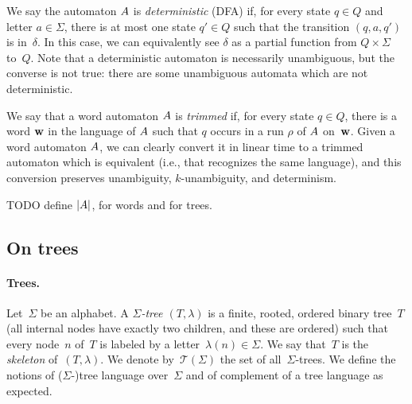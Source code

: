 We say the automaton $A$ is \emph{deterministic} (DFA) if, for every state $q\in Q$ and letter $a \in \Sigma$, there is at most one state $q' \in Q$ such that the transition $(q, a, q')$ is in~$\delta$. In this case, we can equivalently see $\delta$ as a partial function from $Q \times \Sigma$ to~$Q$.
Note that a deterministic automaton is necessarily unambiguous, but the converse is not true: there are some unambiguous automata which are not deterministic.

We say that a word automaton $A$ is \emph{trimmed} if, for every state $q\in Q$, there is a word $\mathbf{w}$ in the language of $A$ such that $q$ occurs in a run $\rho$ of $A$ on~$\mathbf{w}$. Given a word automaton $A$, we can clearly convert it in linear time to a trimmed automaton which is equivalent (i.e., that recognizes the same language), and this conversion preserves unambiguity, $k$-unambiguity, and determinism.

TODO define $|A|$, for words and for trees.

\subsection{On trees}
\label{subsubsec:ufas-trees}

\paragraph*{Trees.}
Let~$\Sigma$ be an alphabet.  A \emph{$\Sigma$-tree $(T,\lambda)$} is a finite,
rooted, ordered binary tree~$T$ (all internal nodes have exactly two children,
and these are ordered) such that every node~$n$ of~$T$ is labeled by a
letter~$\lambda(n) \in \Sigma$. We say that~$T$ is the \emph{skeleton}
of~$(T,\lambda)$. We denote by~$\mathcal{T}(\Sigma)$ the set of
all~$\Sigma$-trees. We define the notions of ($\Sigma$-)tree language
over~$\Sigma$ and of complement of a tree language as expected.

